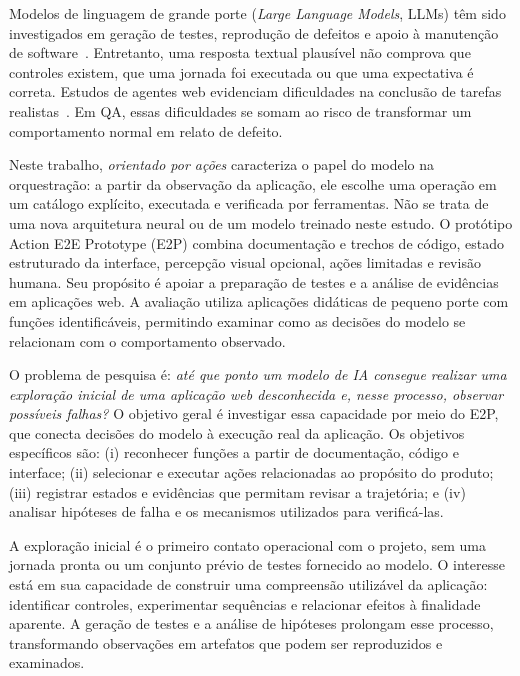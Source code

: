 \documentclass[12pt]{article}
\begin{document}
Modelos de linguagem de grande porte (\textit{Large Language Models}, LLMs) têm sido investigados em geração de testes, reprodução de defeitos e apoio à manutenção de software~\cite{wang2024survey,kang2023libro}. Entretanto, uma resposta textual plausível não comprova que controles existem, que uma jornada foi executada ou que uma expectativa é correta. Estudos de agentes web evidenciam dificuldades na conclusão de tarefas realistas~\cite{zhou2024webarena,drouin2024workarena}. Em QA, essas dificuldades se somam ao risco de transformar um comportamento normal em relato de defeito.

Neste trabalho, \textit{orientado por ações} caracteriza o papel do modelo na orquestração: a partir da observação da aplicação, ele escolhe uma operação em um catálogo explícito, executada e verificada por ferramentas. Não se trata de uma nova arquitetura neural ou de um modelo treinado neste estudo. O protótipo Action E2E Prototype (E2P) combina documentação e trechos de código, estado estruturado da interface, percepção visual opcional, ações limitadas e revisão humana. Seu propósito é apoiar a preparação de testes e a análise de evidências em aplicações web. A avaliação utiliza aplicações didáticas de pequeno porte com funções identificáveis, permitindo examinar como as decisões do modelo se relacionam com o comportamento observado.

O problema de pesquisa é: \textit{até que ponto um modelo de IA consegue realizar uma exploração inicial de uma aplicação web desconhecida e, nesse processo, observar possíveis falhas?} O objetivo geral é investigar essa capacidade por meio do E2P, que conecta decisões do modelo à execução real da aplicação. Os objetivos específicos são: (i) reconhecer funções a partir de documentação, código e interface; (ii) selecionar e executar ações relacionadas ao propósito do produto; (iii) registrar estados e evidências que permitam revisar a trajetória; e (iv) analisar hipóteses de falha e os mecanismos utilizados para verificá-las.

A exploração inicial é o primeiro contato operacional com o projeto, sem uma jornada pronta ou um conjunto prévio de testes fornecido ao modelo. O interesse está em sua capacidade de construir uma compreensão utilizável da aplicação: identificar controles, experimentar sequências e relacionar efeitos à finalidade aparente. A geração de testes e a análise de hipóteses prolongam esse processo, transformando observações em artefatos que podem ser reproduzidos e examinados.
\end{document}

